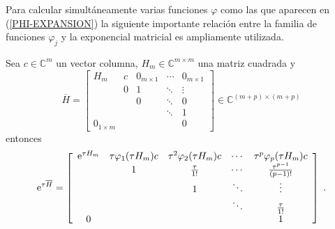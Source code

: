 Para calcular simultáneamente varias funciones $\varphi$ como las que aparecen en (\ref{PHI-EXPANSION}) la siguiente importante relación entre la familia de funciones $\varphi_j$ y la exponencial matricial es ampliamente utilizada.
\begin{theorem}\label{theorem:exp-phi}
    \cite{sidje1998expokit} Sea $c\in\mathbb{C}^{m}$ un vector columna, $H_m\in\mathbb{C}^{m\times m}$ una matriz cuadrada y 
    \begin{equation}
    \overline{H} = \left[\begin{array}{ccccc}
    H_m & c & 0_{m \times 1} & \cdots & 0_{m \times 1} \\
          & 0 & 1 & \ddots & \vdots \\
          &   & 0 & \ddots & 0 \\
          &   &   & \ddots & 1 \\
       0_{1\times m}  &   &   &        & 0
    \end{array}\right]\in \mathbb{C}^{(m+p)\times(m+p)}
    \end{equation}
    entonces
     \begin{equation}
    \mathrm{e}^{\tau\overline{H}} = \left[\begin{array}{ccccc}
    \mathrm{e}^{\tau H_m} & \tau\varphi_1(\tau H_m)c & \tau^{2}\varphi_2(\tau H_m)c & \cdots & \tau^{p}\varphi_p(\tau H_m)c \\
      & 1 & \frac{\tau}{1!} & \cdots & \frac{\tau^{p-1}}{(p-1)!} \\
      &   & 1 & \ddots & \vdots \\
      &   &   & \ddots & \frac{\tau}{1!} \\
    0 &   &   &        & 1
    \end{array}\right]  \;.
    \end{equation}
\end{theorem}